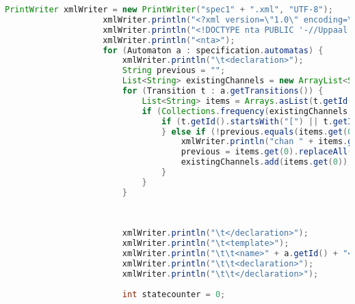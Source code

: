 \begin{lstlisting}[language=java, caption={példa unit teszteset.},captionpos=b]
					PrintWriter xmlWriter = new PrintWriter("spec1" + ".xml", "UTF-8");
					xmlWriter.println("<?xml version=\"1.0\" encoding=\"utf-8\"?>");
					xmlWriter.println("<!DOCTYPE nta PUBLIC '-//Uppaal Team//DTD Flat System 1.1//EN' 'http://www.it.uu.se/research/group/darts/uppaal/flat-1_1.dtd'>");
					xmlWriter.println("<nta>");
					for (Automaton a : specification.automatas) {
						xmlWriter.println("\t<declaration>");
						String previous = "";
						List<String> existingChannels = new ArrayList<String>();
						for (Transition t : a.getTransitions()) {
							List<String> items = Arrays.asList(t.getId().split("\\s*;\\s*"));
							if (Collections.frequency(existingChannels, items.get(0)) == 0) {
								if (t.getId().startsWith("[") || t.getId().startsWith("![")) {
								} else if (!previous.equals(items.get(0).replaceAll("\\(", "_").replaceAll("\\)", "_").replaceAll("\\.", "__").replaceAll("!", "not").replaceAll("&", "_and_").replaceAll("\\s", ""))){
									xmlWriter.println("chan " + items.get(0).replaceAll("\\(", "_").replaceAll("\\)", "_").replaceAll("\\.", "__").replaceAll("!", "not").replaceAll("&", "_and_").replaceAll("\\s", "") + ";");
									previous = items.get(0).replaceAll("\\(", "_").replaceAll("\\)", "_").replaceAll("\\.", "__").replaceAll("!", "not").replaceAll("&", "_and_").replaceAll("\\s", "");
									existingChannels.add(items.get(0));
								}
							}
						}
						
						
						
						xmlWriter.println("\t</declaration>");
						xmlWriter.println("\t<template>");
						xmlWriter.println("\t\t<name>" + a.getId() + "</name>");
						xmlWriter.println("\t\t<declaration>");
						xmlWriter.println("\t\t</declaration>");
						
						int statecounter = 0;
						

\end{lstlisting}
